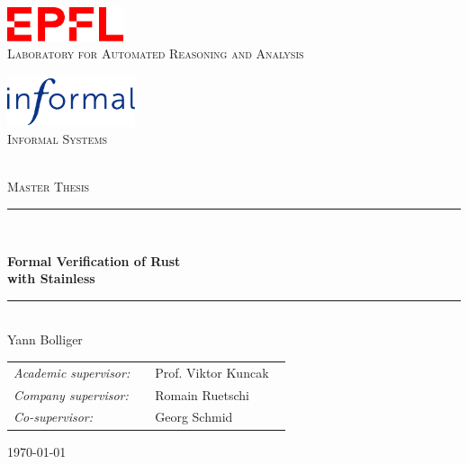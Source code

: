 \thispagestyle{empty}
\begin{center}

\begin{minipage}[b]{.4\textwidth}
  \begin{center}
    \includegraphics[height=10mm]{img/epfl-logo.pdf}\\
    \vspace*{3mm}
    \textsc{Laboratory for Automated Reasoning and Analysis}
  \end{center}
\end{minipage}
\begin{minipage}[b]{.4\textwidth}
  \begin{center}
    \includegraphics[height=15mm]{img/informal-logo.pdf}\\
    \textsc{Informal Systems}\\~
  \end{center}
\end{minipage}

\vspace{3cm}
{\Large \textsc{Master Thesis}}
\vspace*{1.5cm}

\rule{.9\linewidth}{.6pt}\\[0.4cm]
{\huge \bfseries Formal Verification of Rust \\ with Stainless \par}\vspace{0.4cm}
\rule{.9\linewidth}{.6pt}\\[1.5cm]

\vspace*{1cm}
{\Large Yann Bolliger}
\vspace*{1cm}

\begin{tabular}{ll}
\textit{Academic supervisor:}   & ~~Prof. Viktor Kuncak \\
\textit{Company supervisor:} & ~~Romain Ruetschi ~~~~ \\
\textit{Co-supervisor:}       & ~~Georg Schmid
\end{tabular}

\vspace*{3cm}
\today\\[4cm] %

\end{center}
\clearpage

